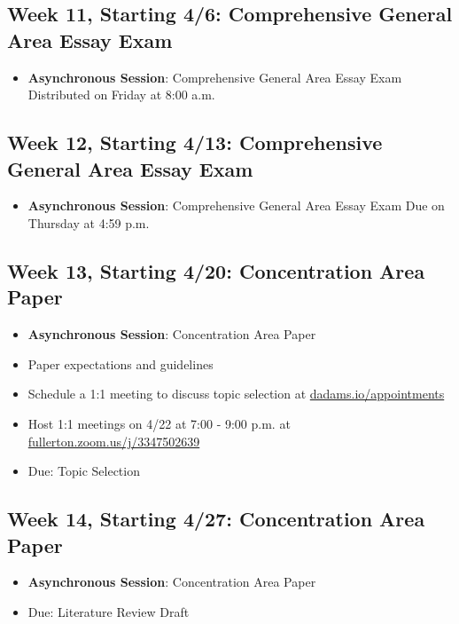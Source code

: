 \documentclass[11pt, letterpaper]{article}
\begin{document}
\subsection*{Week 11, Starting 4/6: Comprehensive General Area Essay Exam}
\begin{itemize}
    \item \textbf{Asynchronous Session}: Comprehensive General Area Essay Exam Distributed on Friday at 8:00 a.m.
\end{itemize}

\subsection*{Week 12, Starting 4/13: Comprehensive General Area Essay Exam}
\begin{itemize}
    \item \textbf{Asynchronous Session}: Comprehensive General Area Essay Exam Due on Thursday at 4:59 p.m.
\end{itemize}

\subsection*{Week 13, Starting 4/20: Concentration Area Paper}
\begin{itemize}
    \item \textbf{Asynchronous Session}: Concentration Area Paper
    \item Paper expectations and guidelines 
    \item Schedule a 1:1 meeting to discuss topic selection at \href{https://dadams.io/appointments}{dadams.io/appointments}
    \item Host 1:1 meetings on 4/22 at 7:00 - 9:00 p.m. at \href{https://fullerton.zoom.us/j/3347502639}{fullerton.zoom.us/j/3347502639}
    \item Due: Topic Selection
\end{itemize}

\subsection*{Week 14, Starting 4/27: Concentration Area Paper}
\begin{itemize}
    \item \textbf{Asynchronous Session}: Concentration Area Paper
    \item Due: Literature Review Draft
\end{itemize}
\end{document}
